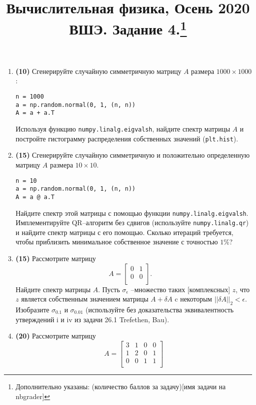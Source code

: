 \documentclass[prb,papersize=a4paper,notitlepage]{revtex4-1}%
\begin{document}
\title{Вычислительная физика, Осень 2020 ВШЭ. Задание 4.\footnote{Дополнительно указаны: (количество баллов за задачу)[имя задачи на nbgrader]}}
\maketitle
\begin{enumerate}
\item \textbf{(10)} Сгенерируйте случайную симметричную матрицу $A$ размера $1000 \times 1000$:
\lstset{language=Python}
\lstset{frame=lines}
\lstset{basicstyle=\ttfamily}
\begin{lstlisting}
n = 1000
a = np.random.normal(0, 1, (n, n))
A = a + a.T
\end{lstlisting}
Используя функцию \lstinline{numpy.linalg.eigvalsh}, найдите спектр матрицы $A$ и постройте гистограмму распределения собственных значений (\lstinline{plt.hist}).
\item \textbf{(15)} Сгенерируйте случайную симметричную и положительно определенную матрицу $A$ размера $10 \times 10$. 
\lstset{language=Python}
\lstset{frame=lines}
\lstset{basicstyle=\ttfamily}
\begin{lstlisting}
n = 10
a = np.random.normal(0, 1, (n, n))
A = a @ a.T
\end{lstlisting}
Найдите спектр этой матрицы с помощью функции \lstinline{numpy.linalg.eigvalsh}. Имплементируйте $\textrm{QR}$--алгоритм без сдвигов (используйте \lstinline{numpy.linalg.qr}) и найдите спектр матрицы с его помощью. Сколько итераций требуется, чтобы приблизить минимальное собственное значение с точностью $1\%$?
\item \textbf{(15)} Рассмотрите матрицу 
$$
A=\begin{bmatrix}
0 & 1\\
0 & 0\\
\end{bmatrix}.\quad
$$
Найдите спектр матрицы $A$. Пусть $\sigma_\epsilon$ --множество таких [комплексных] $z$, что $z$ является собственным значением матрицы $A+\delta A$ c некоторым $||\delta A||_2<\epsilon$. Изобразите $\sigma_{0.1}$ и $\sigma_{0.01}$ (используйте без доказательства эквивалентность утверждений i и iv из задачи 26.1 Trefethen, Bau).
\item \textbf{(20)} Рассмотрите матрицу 
$$
A=\begin{bmatrix}
3 & 1 & 0 & 0\\
1 & 2 & 0 & 1\\
0 & 0 & 1 & 1\\

\end{bmatrix}$$
\end{enumerate}
\end{document}
